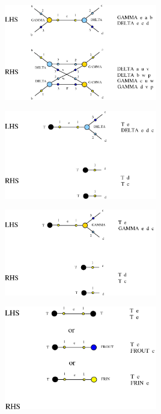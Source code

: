 \documentclass{article}
\begin{document}
\vspace{.5cm}
 
\centerline{\includegraphics[width=0.5\textwidth]{../img/GAMMA-DELTA.jpg}
}
\vspace{.5cm}




\vspace{.5cm}
 
\centerline{\includegraphics[width=0.5\textwidth]{../img/term3-DELTA-T.jpg}
}
\vspace{.5cm}

\centerline{\includegraphics[width=0.5\textwidth]{../img/term3-GAMMA-T.jpg}
}
\vspace{.5cm}

\vspace{.5cm}
 
\centerline{\includegraphics[width=0.5\textwidth]{../img/remove4-T-T.jpg}
}
\vspace{.5cm}
\end{document}
